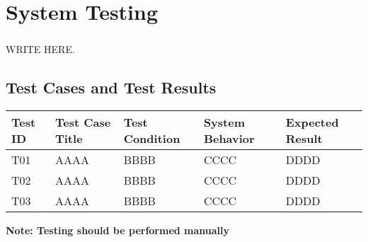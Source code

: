 \chapter{System Testing}
\paragraph{} WRITE HERE.
\section{Test Cases and Test Results}
\begin{longtable}{ | p{1cm} | p{3.5cm} | p{4cm} | p{4cm} | p{4cm} |}
      \hline
      \textbf{Test ID} & \textbf{Test Case Title} & \textbf{Test Condition} & \textbf{System Behavior} & \textbf{Expected Result}\\
      \hline
      T01 & AAAA & BBBB & CCCC & DDDD\\
      \hline
      T02 & AAAA & BBBB & CCCC & DDDD\\
      \hline
      T03 & AAAA & BBBB & CCCC & DDDD\\
      \hline
\end{longtable}

\textbf{Note: Testing should be performed manually}